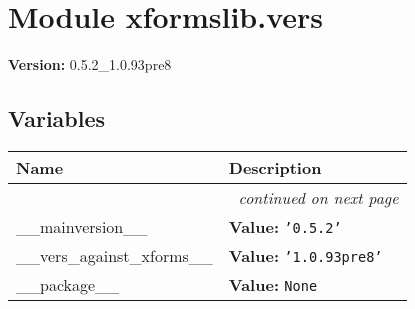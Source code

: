 %
%
%


\section{Module xformslib.vers}

    \label{xformslib:vers}
\textbf{Version:} 0.5.2\_1.0.93pre8





  \subsection{Variables}

    \vspace{-1cm}
\hspace{\varindent}\begin{longtable}{|p{\varnamewidth}|p{\vardescrwidth}|l}
\cline{1-2}
\cline{1-2} \centering \textbf{Name} & \centering \textbf{Description}& \\
\cline{1-2}
\endhead\cline{1-2}\multicolumn{3}{r}{\small\textit{continued on next page}}\\\endfoot\cline{1-2}
\endlastfoot\raggedright \_\-\_\-m\-a\-i\-n\-v\-e\-r\-s\-i\-o\-n\-\_\-\_\- & \raggedright \textbf{Value:} 
{\tt \texttt{'}\texttt{0.5.2}\texttt{'}}&\\
\cline{1-2}
\raggedright \_\-\_\-v\-e\-r\-s\-\_\-a\-g\-a\-i\-n\-s\-t\-\_\-x\-f\-o\-r\-m\-s\-\_\-\_\- & \raggedright \textbf{Value:} 
{\tt \texttt{'}\texttt{1.0.93pre8}\texttt{'}}&\\
\cline{1-2}
\raggedright \_\-\_\-p\-a\-c\-k\-a\-g\-e\-\_\-\_\- & \raggedright \textbf{Value:} 
{\tt None}&\\
\cline{1-2}
\end{longtable}

